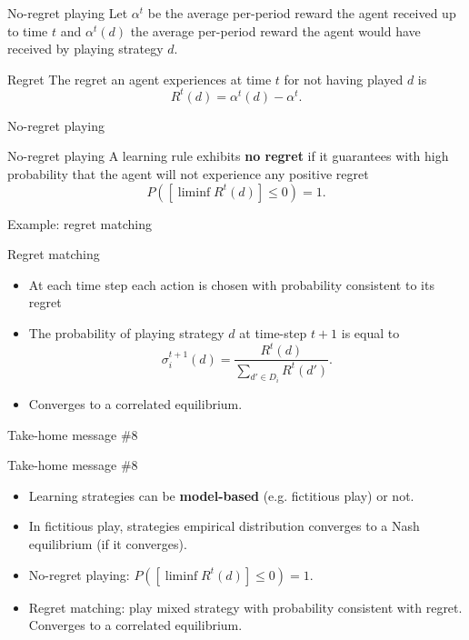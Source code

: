 \begin{frame}{No-regret playing}
    Let $\alpha^t$ be the average per-period reward the agent received up to time $t$
    and $\alpha^t(d)$ the average per-period reward the agent would have received by playing
    strategy $d$. \\
    
    \begin{block}{Regret}
        The regret an agent experiences at time $t$ for not having played $d$ is
        $$R^t(d) = \alpha^t(d) - \alpha^t.$$
    \end{block}
\end{frame}

\begin{frame}{No-regret playing}
    \begin{block}{No-regret playing}
        A learning rule exhibits \textbf{no regret} if it guarantees with high probability that the
        agent will not experience any positive regret
        $$P([\liminf R^t(d)] \leq 0) = 1.$$
    \end{block}
\end{frame}

\begin{frame}{Example: regret matching}
    \begin{block}{Regret matching}
        \begin{itemize}
            \item At each time step each action is chosen with probability consistent to its regret
            \item The probability of playing strategy $d$ at time-step $t+1$ is equal to
            \[
                \sigma_i^{t+1}(d)= \frac{R^t(d)}{\sum_{d'\in D_i} R^t(d')}.
            \]
            \item {\color{green}Converges to a correlated equilibrium}.
        \end{itemize}
    \end{block}
\end{frame}

\begin{frame}{Take-home message \#8}
    \begin{block}{Take-home message \#8}
        \begin{itemize}
            \item Learning strategies can be \textbf{model-based} (e.g. fictitious play) or not.
            \item In fictitious play, {\color{green}strategies empirical distribution converges to a
            Nash equilibrium} (if it converges).
            \item No-regret playing: $P([\liminf R^t(d)] \leq 0) = 1$.
            \item Regret matching: play mixed strategy with probability consistent with regret.
            {\color{green}Converges to a correlated equilibrium}.
        \end{itemize}
    \end{block}
\end{frame}
